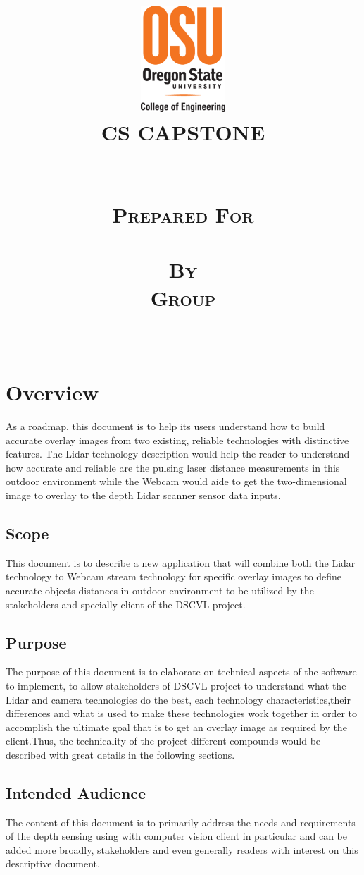 \documentclass[10pt,draftclsnofoot,onecolumn,journal,compsoc]{IEEEtran}
\date{\displaydate{date}}
\title{\centering
			\includegraphics[height=4cm,natwidth=200,natheight=300]{images/osu_logo.eps}\\\vspace{.5in}
		\scshape{\huge CS CAPSTONE \DocType \\\vspace{.5in}
		\textbf{\Huge\CapstoneProjectName}\\\vspace{1in}
		\large	\displaydate{date}\\\vspace{.2in}		
			\large {Prepared For}\\\vspace{.1in}
			\textbf{{\Large \CapstoneSponsorPerson}} \\\vspace{.8in}		
				\large {By} \\\vspace{.1in}
				\textbf {Group \CapstoneTeamNumber}\\\vspace{.1in}
				\Large {\CapstoneTeamName}\\\vspace{.1in}
				\textbf{ { \GroupMemberTwo}}
}  
}
\begin{document}
 \maketitle
\IEEEdisplaynontitleabstractindextext
\IEEEpeerreviewmaketitle
\newpage
{}
\tableofcontents
\newpage

\section{Overview}
As a roadmap, this document is to help its users understand how to build accurate overlay images from two existing, reliable technologies with distinctive features. The Lidar technology description would help the reader to understand how accurate and reliable are the pulsing laser distance measurements in this outdoor environment while the Webcam would aide to get the two-dimensional image to overlay to the depth Lidar scanner sensor data inputs.
\subsection{Scope}
This document is to describe a new application that will combine both the Lidar technology to Webcam stream technology for specific overlay images to define accurate objects distances in outdoor environment to be utilized by the stakeholders  and specially client of the DSCVL project.

\subsection{Purpose}
The purpose of this document is to elaborate on technical aspects of the software to implement, to allow stakeholders of DSCVL project to understand what the Lidar and camera  technologies do the best, each technology characteristics,their differences and what is used to make these technologies work together in order to accomplish the ultimate goal that is to get an overlay image as required by the client.Thus, the technicality of the project different compounds would be described with great details  in the following sections. 

\subsection{Intended Audience}
 The content of this document is to primarily address the needs and requirements of the depth sensing using with computer vision client in particular and can be added more broadly, stakeholders  and even generally readers with interest on this descriptive document.
\end{document}
